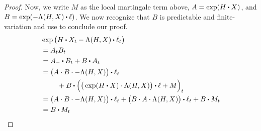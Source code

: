 \begin{proof}
  Now, we write $M$ as the local martingale term above, $A = \exp(H \shortInt \X)$, and $B = \exp(-\ode(H, \X) \shortInt \leb)$.
  We now recognize that $B$ is predictable and finite-variation and use \cite[Proposition I.4.49(b)]{jacod2003} to conclude our proof.
  \begin{align*}
    &\exp\big( H \shortInt \X_t - \ode(H, \X) \shortInt \leb_t \big) \\
    &= A_t B_t \\
    &= A_- \shortInt B_t + B \shortInt A_t \\
    &= \begin{aligned}[t]
      &\big( A \cdot B \cdot -\ode(H, \X) \big) \shortInt \leb_t \\
      &\quad+ B \shortInt \Big( \big( \exp( H \shortInt \X ) \cdot \ode(H, \X) \big) \shortInt \leb + M \Big)_t 
    \end{aligned} \\
    &= \big( A \cdot B \cdot -\ode(H, \X) \big) \shortInt \leb_t + \big( B \cdot A \cdot \ode(H, \X) \big) \shortInt \leb_t + B \shortInt M_t \\
    &= B \shortInt M_t
  \end{align*}
\end{proof}
